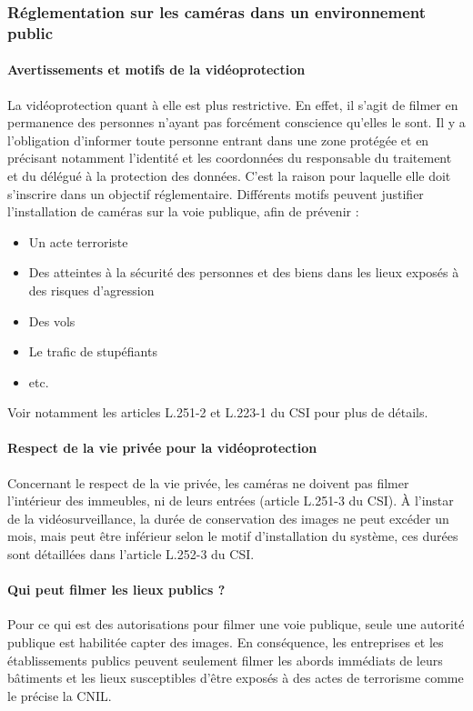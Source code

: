 \subsubsection{Réglementation sur les caméras dans un environnement public}
\label{sec:reglementation_publique}

\paragraph{Avertissements et motifs de la vidéoprotection}
\label{motifs_vidéoprotection}

La vidéoprotection quant à elle est plus restrictive. En effet, il s'agit de filmer en permanence des personnes n'ayant pas forcément conscience qu'elles le sont. 
Il y a l'obligation d'informer toute personne entrant dans une zone protégée et en précisant notamment l’identité et les coordonnées du responsable du traitement et du délégué à la protection des données.
C'est la raison pour laquelle elle doit s'inscrire dans un objectif réglementaire. Différents motifs peuvent justifier l'installation de caméras sur la voie publique, afin de prévenir :
\begin{itemize}
    \item Un acte terroriste
    \item Des atteintes à la sécurité des personnes et des biens dans les lieux exposés à des risques d'agression
    \item Des vols
    \item Le trafic de stupéfiants
    \item etc.
\end{itemize}
Voir notamment les articles L.251-2 et L.223-1 du \gls{CSI} pour plus de détails.

\paragraph{Respect de la vie privée pour la vidéoprotection}
\label{vp_vidéoprotection}

Concernant le respect de la vie privée, les caméras ne doivent pas filmer l'intérieur des immeubles, ni de leurs entrées (article L.251-3 du \gls{CSI}). 
À l'instar de la vidéosurveillance, la durée de conservation des images ne peut excéder un mois, 
mais peut être inférieur selon le motif d'installation du système, ces durées sont détaillées dans l'article L.252-3 \cite{Reglementation} du \gls{CSI}.

\paragraph{Qui peut filmer les lieux publics ?}
\label{autorisation_vidéoprotection}
Pour ce qui est des autorisations pour filmer une voie publique, seule une autorité publique est habilitée capter des images. 
En conséquence, les entreprises et les établissements publics peuvent seulement filmer les abords immédiats de leurs bâtiments 
et les lieux susceptibles d’être exposés à des actes de terrorisme comme le précise la \gls{CNIL}.

